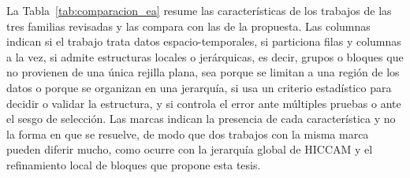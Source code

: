 La Tabla~\ref{tab:comparacion_ea} resume las características de los trabajos de
las tres familias revisadas y las compara con las de la propuesta. Las columnas
indican si el trabajo trata datos espacio-temporales, si particiona filas y
columnas a la vez, si admite estructuras locales o jerárquicas, es decir, grupos o
bloques que no provienen de una única rejilla plana, sea porque se limitan a una
región de los datos o porque se organizan en una jerarquía, si usa un criterio
estadístico para decidir o validar la estructura, y si controla el error ante
múltiples pruebas o ante el sesgo de selección. Las marcas indican la presencia
de cada característica y no la forma en que se resuelve, de modo que dos trabajos
con la misma marca pueden diferir mucho, como ocurre con la jerarquía global de
HICCAM y el refinamiento local de bloques que propone esta tesis.

